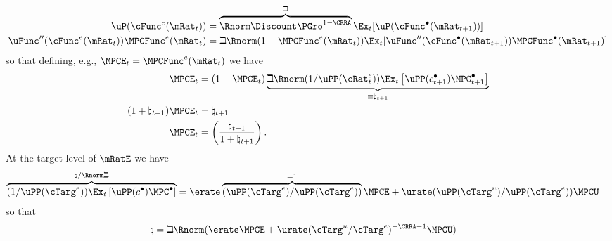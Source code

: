\documentclass{\handout}
\begin{document}
\begin{equation}\begin{gathered}\begin{aligned}
  \uP(\cFunc^{e}(\mRat_{t})) & = \overbrace{\Rnorm \Discount \PGro^{1-\CRRA}}^{\beth} \Ex_{t}[\uP(\cFunc^{\bullet}(\mRat_{t+1}))]
\\  \uFunc^{\prime\prime}(\cFunc^{e}(\mRat_{t}))\MPCFunc^{e}(\mRat_{t}) & = \beth  \Rnorm (1-\MPCFunc^{e}(\mRat_{t}))\Ex_{t}[\uFunc^{\prime\prime}(\cFunc^{\bullet}(\mRat_{t+1}))\MPCFunc^{\bullet}(\mRat_{t+1})] \label{eq:dEuler}
\end{aligned}\end{gathered}\end{equation}
so that defining, e.g., $\MPCE_{t} = \MPCFunc^{e}(\mRat_{t})$ we have 
\begin{equation}\begin{gathered}\begin{aligned}
 \MPCE_{t} & =  (1-\MPCE_{t}) \underbrace{\beth \Rnorm (1/\uPP({\cRat}^{e}_{t}))\Ex_{t}\left[\uPP(c^{\bullet}_{t+1})\MPC^{\bullet}_{t+1}\right]}_{\equiv \natural_{t+1}} \notag %
\\ (1+\natural_{t+1})\MPCE_{t} & = \natural_{t+1} \label{eq:naturalMPC}
\\ \MPCE_{t} & = \left(\frac{\natural_{t+1}}{1+\natural_{t+1}}\right) \notag %
.
\end{aligned}\end{gathered}\end{equation}
At the target level of $\mRatE$ we have 
\begin{equation*}\begin{gathered}\begin{aligned}
  \overbrace{(1/\uPP(\cTarg^{e}))\Ex_{t}\left[\uPP(c^{\bullet})\MPC^{\bullet}\right]}^{\natural / \Rnorm \beth} & =  \erate \overbrace{(\uPP(\cTarg^{e})/\uPP(\cTarg^{e}))}^{=1}\MPCE+\urate (\uPP(\cTarg^{u})/\uPP(\cTarg^{e}))\MPCU
\end{aligned}\end{gathered}\end{equation*}
so that 
\begin{equation}\begin{gathered}\begin{aligned}
  \natural & =   \beth \Rnorm (\erate \MPCE + \urate (\cTarg^{u}/\cTarg^{e})^{-\CRRA-1} \MPCU)
\end{aligned}\end{gathered}\end{equation}
\end{document}
